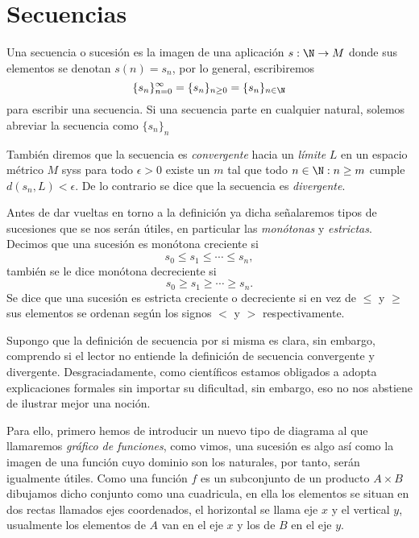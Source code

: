 \documentclass[11pt,oneside,a4paper]{book}
\begin{document}
\section{Secuencias}
\begin{mydef}[Secuencia]
	Una secuencia o sucesión es la imagen de una aplicación $s:\N\rightarrow M$ donde sus elementos se denotan $s(n)=s_n$, por lo general, escribiremos
	$$\{s_n\}_{n=0}^\infty=\{s_n\}_{n\geq 0}=\{s_n\}_{n\in\N}$$
	para escribir una secuencia. Si una secuencia parte en cualquier natural, solemos abreviar la secuencia como $\{s_n\}_n$

	También diremos que la secuencia es \textit{convergente} hacia un \textit{límite} $L$ en un espacio métrico $M$ syss para todo $\epsilon\gt 0$ existe un $m$ tal que todo $n\in\N:n\geq m$ cumple $d(s_n,L)\lt\epsilon$. De lo contrario se dice que la secuencia es \textit{divergente}.
\end{mydef}
Antes de dar vueltas en torno a la definición ya dicha señalaremos tipos de sucesiones que se nos serán útiles, en particular las \textit{monótonas} y \textit{estrictas}. Decimos que una sucesión es monótona creciente si
$$s_0\leq s_1\leq\cdots\leq s_n,$$
también se le dice monótona decreciente si
$$s_0\geq s_1\geq\cdots\geq s_n.$$
Se dice que una sucesión es estricta creciente o decreciente si en vez de $\leq$ y $\geq$ sus elementos se ordenan según los signos $\lt$ y $\gt$ respectivamente.

Supongo que la definición de secuencia por si misma es clara, sin embargo, comprendo si el lector no entiende la definición de secuencia convergente y divergente. Desgraciadamente, como científicos estamos obligados a adopta explicaciones formales sin importar su dificultad, sin embargo, eso no nos abstiene de ilustrar mejor una noción.

Para ello, primero hemos de introducir un nuevo tipo de diagrama al que llamaremos \textit{gráfico de funciones}, como vimos, una sucesión es algo así como la imagen de una función cuyo dominio son los naturales, por tanto, serán igualmente útiles. Como una función $f$ es un subconjunto de un producto $A\times B$ dibujamos dicho conjunto como una cuadricula, en ella los elementos se situan en dos rectas llamados ejes coordenados, el horizontal se llama eje $x$ y el vertical $y$, usualmente los elementos de $A$ van en el eje $x$ y los de $B$ en el eje $y$.
\end{document}
